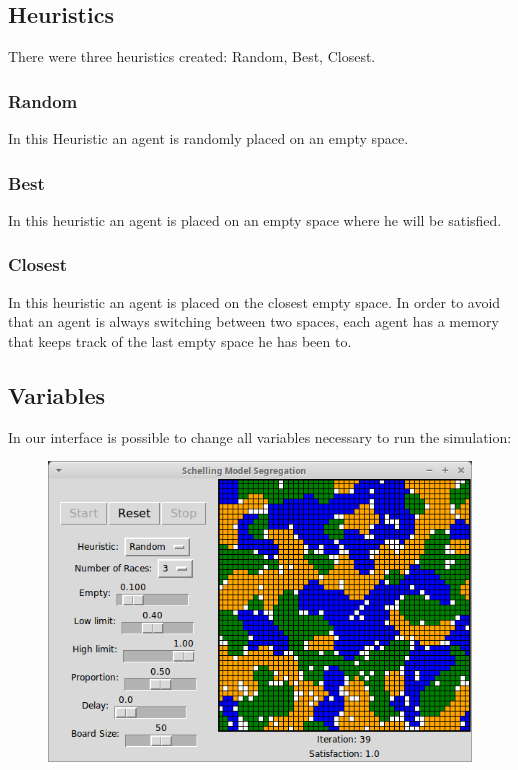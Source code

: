 \documentclass[a4paper,titlepage,11pt]{article}
\begin{document}
\subsection{Heuristics}
There were three heuristics created: Random, Best, Closest.

\subsubsection{Random}
In this Heuristic an agent is randomly placed on an empty space.

\subsubsection{Best}
In this heuristic an agent is placed on an empty space where he will be satisfied.

\subsubsection{Closest}
In this heuristic an agent is placed on the closest empty space. In order to avoid that an agent is always switching between two spaces, each agent has a memory that keeps track of the last empty space he has been to.

\newpage

\subsection{Variables}
In our interface is possible to change all variables necessary to run the simulation:


\begin{figure}[h]
    \centering
    \includegraphics[scale=0.50]{img/interface.png}
\end{figure}
\end{document}
